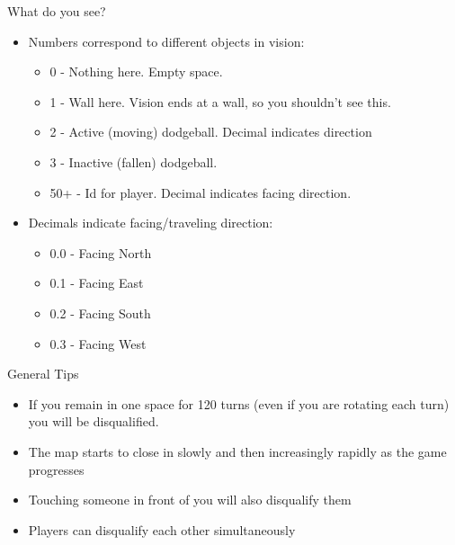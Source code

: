 \documentclass[pdf, aspectratio=169, 12pt]{beamer}
\begin{document}
\begin{frame}{What do you see?}
	\begin{itemize}
		\item Numbers correspond to different objects in vision:
			\begin{itemize}
				\item 0 - Nothing here. Empty space.
				\item 1 - Wall here. Vision ends at a wall, so you shouldn't see this.
				\item 2 - Active (moving) dodgeball. Decimal indicates direction
				\item 3 - Inactive (fallen) dodgeball.
				\item 50+ - Id for player. Decimal indicates facing direction.
			\end{itemize}
		\item Decimals indicate facing/traveling direction:
			\begin{itemize}
				\item 0.0 - Facing North
				\item 0.1 - Facing East
				\item 0.2 - Facing South
				\item 0.3 - Facing West
			\end{itemize}
	\end{itemize}
\end{frame}

\begin{frame}{General Tips}
	\begin{itemize}
		\item If you remain in one space for 120 turns (even if you are rotating each turn) you will be disqualified.
		\item The map starts to close in slowly and then increasingly rapidly as the game progresses
		\item Touching someone in front of you will also disqualify them
		\item Players can disqualify each other simultaneously
	\end{itemize}
\end{frame}
\end{document}
